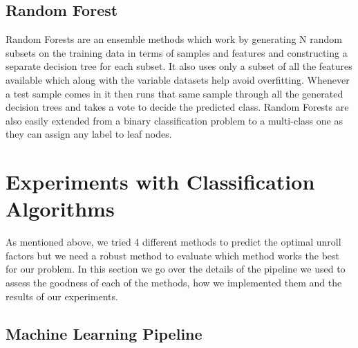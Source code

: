 \documentclass[]{sig-alternate}
\begin{document}
\subsection{Random Forest}
\label{subsec:RandomForest}

Random Forests are an ensemble methods which work by generating N random subsets on the training data in terms of samples and features and constructing a separate decision tree for each subset. It also uses only a subset of all the features available which along with the variable datasets help avoid overfitting. Whenever a test sample comes in it then runs that same sample through all the generated decision trees and takes a vote to decide the predicted class. Random Forests are also easily extended from a binary classification problem to a multi-class one as they can assign any label to leaf nodes. 

\section{Experiments with Classification Algorithms}
\label{sec:ExperimentsClassification}

As mentioned above, we tried 4 different methods to predict the optimal unroll factors but we need a robust method to evaluate which method works the best for our problem. In this section we go over the details of the pipeline we used to assess the goodness of each of the methods, how we implemented them and the results of our experiments. 

\subsection{Machine Learning Pipeline}
\label{subsec:MachineLearningPipeline}
\end{document}
